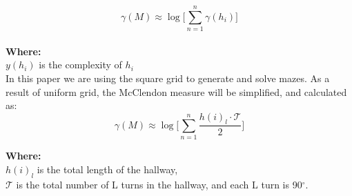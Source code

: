 \begin{equation}
\gamma(M) \approx \log \bigl[\sum_{n =1}^{n}\gamma(h_i)\bigr]
\end{equation}
\\
\textbf{Where:}\\
$y(h_i)$ is the complexity of $h_i$\\
 \newline
In this paper we are using the square grid to generate and solve mazes. As a result of uniform grid, the McClendon measure will be simplified, and calculated as:
\begin{equation} 
\gamma(M) \approx \log \bigl[\sum_{n =1}^{n}\frac{h(i)_l\cdot \mathcal{T}}{2}\bigr]
\end{equation}

\textbf{Where:}\\
$h(i)_l$ is the total length of the hallway,\\
$\mathcal{T}$ is the total number of L turns in the hallway, and each L turn is 90$^\circ$.%
